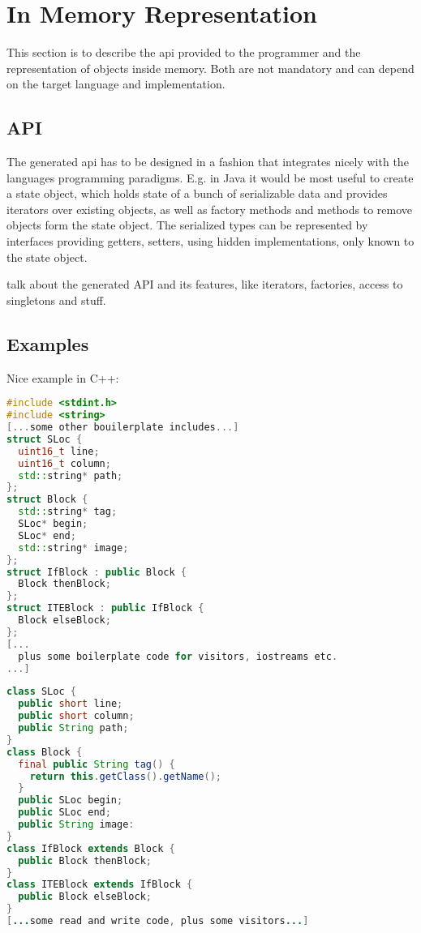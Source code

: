 \section{In Memory Representation}
This section is to describe the \gls{api} provided to the programmer and the representation of objects inside memory. Both are not mandatory and can depend on the target language and implementation.


\subsection{API}

The generated \gls{api} has to be designed in a fashion that integrates nicely with the languages programming paradigms. E.g. in Java it would be most useful to create a state object, which holds state of a bunch of serializable data and provides iterators over existing objects, as well as factory methods and methods to remove objects form the state object. The serialized types can be represented by interfaces providing getters, setters, using hidden implementations, only known to the state object.

talk about the generated API and its features, like iterators, factories, access to singletons and stuff.

\subsection*{Examples}

Nice example in C++:
\begin{lstlisting}[label=cppExample,caption=C++ Examples,language=C++]
#include <stdint.h>
#include <string>
[...some other bouilerplate includes...]
struct SLoc {
  uint16_t line;
  uint16_t column;
  std::string* path;
};
struct Block {
  std::string* tag;
  SLoc* begin;
  SLoc* end;
  std::string* image;
};
struct IfBlock : public Block {
  Block thenBlock;
};
struct ITEBlock : public IfBlock {
  Block elseBlock;
};
[...
  plus some boilerplate code for visitors, iostreams etc.
...]
\end{lstlisting}

\begin{lstlisting}[label=javaExample,caption=Java Examples,language=Java]
class SLoc {
  public short line;
  public short column;
  public String path;
}
class Block {
  final public String tag() {
    return this.getClass().getName();
  }
  public SLoc begin;
  public SLoc end;
  public String image:
}
class IfBlock extends Block {
  public Block thenBlock;
}
class ITEBlock extends IfBlock {
  public Block elseBlock;
}
[...some read and write code, plus some visitors...]
\end{lstlisting}


